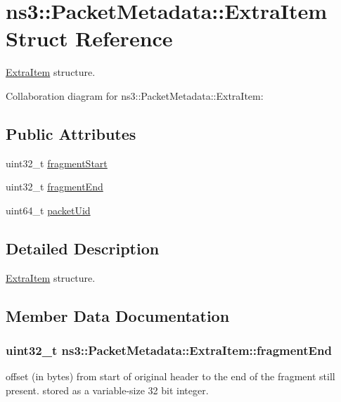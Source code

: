 \hypertarget{structns3_1_1PacketMetadata_1_1ExtraItem}{}\section{ns3\+:\+:Packet\+Metadata\+:\+:Extra\+Item Struct Reference}
\label{structns3_1_1PacketMetadata_1_1ExtraItem}


\hyperlink{structns3_1_1PacketMetadata_1_1ExtraItem}{Extra\+Item} structure.  




Collaboration diagram for ns3\+:\+:Packet\+Metadata\+:\+:Extra\+Item\+:
\subsection*{Public Attributes}
\begin{DoxyCompactItemize}
\item 
uint32\+\_\+t \hyperlink{structns3_1_1PacketMetadata_1_1ExtraItem_aee94f5fc9de7e06392bead6c000692aa}{fragment\+Start}
\item 
uint32\+\_\+t \hyperlink{structns3_1_1PacketMetadata_1_1ExtraItem_aaaa9dcf424b6aebba233c0d52fa0d304}{fragment\+End}
\item 
uint64\+\_\+t \hyperlink{structns3_1_1PacketMetadata_1_1ExtraItem_aab7c006def71126ef7608b3dc4b001f0}{packet\+Uid}
\end{DoxyCompactItemize}


\subsection{Detailed Description}
\hyperlink{structns3_1_1PacketMetadata_1_1ExtraItem}{Extra\+Item} structure. 

\subsection{Member Data Documentation}
\subsubsection[{\texorpdfstring{fragment\+End}{fragmentEnd}}]{\setlength{\rightskip}{0pt plus 5cm}uint32\+\_\+t ns3\+::\+Packet\+Metadata\+::\+Extra\+Item\+::fragment\+End}\hypertarget{structns3_1_1PacketMetadata_1_1ExtraItem_aaaa9dcf424b6aebba233c0d52fa0d304}{}\label{structns3_1_1PacketMetadata_1_1ExtraItem_aaaa9dcf424b6aebba233c0d52fa0d304}
offset (in bytes) from start of original header to the end of the fragment still present. stored as a variable-\/size 32 bit integer. 
